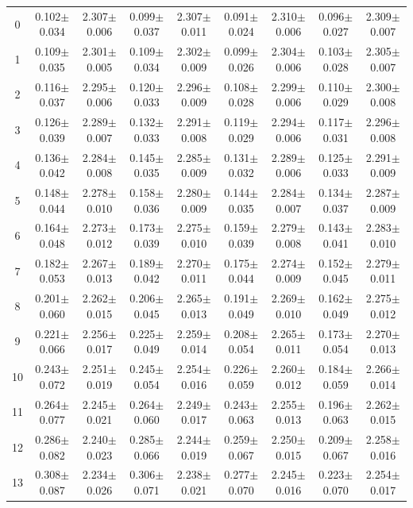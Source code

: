 \begin{table}[H]
{\begin{tabular}{c cc cc cc cc}
0 & 0.102$\pm$0.034 & 2.307$\pm$0.006 & 0.099$\pm$0.037 & 2.307$\pm$0.011 & 0.091$\pm$0.024 & 2.310$\pm$0.006 & 0.096$\pm$0.027 & 2.309$\pm$0.007 \\
1 & 0.109$\pm$0.035 & 2.301$\pm$0.005 & 0.109$\pm$0.034 & 2.302$\pm$0.009 & 0.099$\pm$0.026 & 2.304$\pm$0.006 & 0.103$\pm$0.028 & 2.305$\pm$0.007 \\
2 & 0.116$\pm$0.037 & 2.295$\pm$0.006 & 0.120$\pm$0.033 & 2.296$\pm$0.009 & 0.108$\pm$0.028 & 2.299$\pm$0.006 & 0.110$\pm$0.029 & 2.300$\pm$0.008 \\
3 & 0.126$\pm$0.039 & 2.289$\pm$0.007 & 0.132$\pm$0.033 & 2.291$\pm$0.008 & 0.119$\pm$0.029 & 2.294$\pm$0.006 & 0.117$\pm$0.031 & 2.296$\pm$0.008 \\
4 & 0.136$\pm$0.042 & 2.284$\pm$0.008 & 0.145$\pm$0.035 & 2.285$\pm$0.009 & 0.131$\pm$0.032 & 2.289$\pm$0.006 & 0.125$\pm$0.033 & 2.291$\pm$0.009 \\
5 & 0.148$\pm$0.044 & 2.278$\pm$0.010 & 0.158$\pm$0.036 & 2.280$\pm$0.009 & 0.144$\pm$0.035 & 2.284$\pm$0.007 & 0.134$\pm$0.037 & 2.287$\pm$0.009 \\
6 & 0.164$\pm$0.048 & 2.273$\pm$0.012 & 0.173$\pm$0.039 & 2.275$\pm$0.010 & 0.159$\pm$0.039 & 2.279$\pm$0.008 & 0.143$\pm$0.041 & 2.283$\pm$0.010 \\
7 & 0.182$\pm$0.053 & 2.267$\pm$0.013 & 0.189$\pm$0.042 & 2.270$\pm$0.011 & 0.175$\pm$0.044 & 2.274$\pm$0.009 & 0.152$\pm$0.045 & 2.279$\pm$0.011 \\
8 & 0.201$\pm$0.060 & 2.262$\pm$0.015 & 0.206$\pm$0.045 & 2.265$\pm$0.013 & 0.191$\pm$0.049 & 2.269$\pm$0.010 & 0.162$\pm$0.049 & 2.275$\pm$0.012 \\
9 & 0.221$\pm$0.066 & 2.256$\pm$0.017 & 0.225$\pm$0.049 & 2.259$\pm$0.014 & 0.208$\pm$0.054 & 2.265$\pm$0.011 & 0.173$\pm$0.054 & 2.270$\pm$0.013 \\
10 & 0.243$\pm$0.072 & 2.251$\pm$0.019 & 0.245$\pm$0.054 & 2.254$\pm$0.016 & 0.226$\pm$0.059 & 2.260$\pm$0.012 & 0.184$\pm$0.059 & 2.266$\pm$0.014 \\
11 & 0.264$\pm$0.077 & 2.245$\pm$0.021 & 0.264$\pm$0.060 & 2.249$\pm$0.017 & 0.243$\pm$0.063 & 2.255$\pm$0.013 & 0.196$\pm$0.063 & 2.262$\pm$0.015 \\
12 & 0.286$\pm$0.082 & 2.240$\pm$0.023 & 0.285$\pm$0.066 & 2.244$\pm$0.019 & 0.259$\pm$0.067 & 2.250$\pm$0.015 & 0.209$\pm$0.067 & 2.258$\pm$0.016 \\
13 & 0.308$\pm$0.087 & 2.234$\pm$0.026 & 0.306$\pm$0.071 & 2.238$\pm$0.021 & 0.277$\pm$0.070 & 2.245$\pm$0.016 & 0.223$\pm$0.070 & 2.254$\pm$0.017 \\

\end{tabular}}
\end{table}
